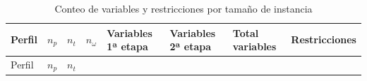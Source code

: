 \documentclass[
  spanish,
  12pt,
]{article}
\begin{document}
\begin{longtable}[]{@{}
  >{\raggedright\arraybackslash}p{}
  >{\centering\arraybackslash}p{}
  >{\centering\arraybackslash}p{}
  >{\centering\arraybackslash}p{}
  >{\centering\arraybackslash}p{}
  >{\centering\arraybackslash}p{}
  >{\centering\arraybackslash}p{}
  >{\centering\arraybackslash}p{}@{}}
\caption{\label{tbl:tabla_4}Conteo de variables y restricciones por
tamaño de instancia}\tabularnewline
\toprule\noalign{}
\begin{minipage}[b]{\linewidth}\raggedright
Perfil
\end{minipage} & \begin{minipage}[b]{\linewidth}\centering
\(n_p\)
\end{minipage} & \begin{minipage}[b]{\linewidth}\centering
\(n_t\)
\end{minipage} & \begin{minipage}[b]{\linewidth}\centering
\(n_\omega\)
\end{minipage} & \begin{minipage}[b]{\linewidth}\centering
Variables 1ª etapa
\end{minipage} & \begin{minipage}[b]{\linewidth}\centering
Variables 2ª etapa
\end{minipage} & \begin{minipage}[b]{\linewidth}\centering
Total variables
\end{minipage} & \begin{minipage}[b]{\linewidth}\centering
Restricciones
\end{minipage} \\
\midrule\noalign{}
\endfirsthead
\toprule\noalign{}
\begin{minipage}[b]{\linewidth}\raggedright
Perfil
\end{minipage} & \begin{minipage}[b]{\linewidth}\centering
\(n_p\)
\end{minipage} & \begin{minipage}[b]{\linewidth}\centering
\(n_t\)
\end{minipage} & \begin{minipage}[b]{\linewidth}\centering

\end{minipage}
\end{longtable}
\end{document}
